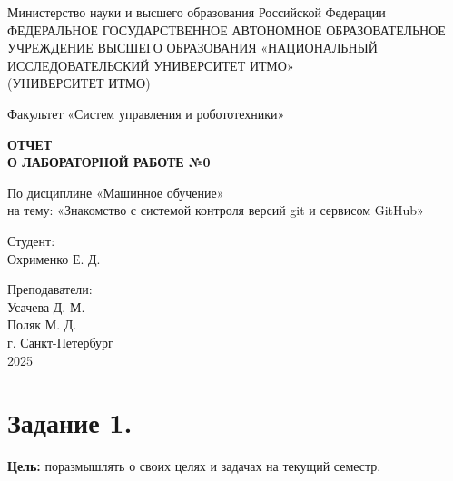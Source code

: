 \documentclass[a4paper,12pt]{article}
\begin{document}
	\begin{titlepage}
		\centering
		\vspace*{1cm}
		
		{\large Министерство науки и высшего образования Российской Федерации}\\
		{\large ФЕДЕРАЛЬНОЕ ГОСУДАРСТВЕННОЕ АВТОНОМНОЕ ОБРАЗОВАТЕЛЬНОЕ УЧРЕЖДЕНИЕ ВЫСШЕГО ОБРАЗОВАНИЯ «НАЦИОНАЛЬНЫЙ ИССЛЕДОВАТЕЛЬСКИЙ УНИВЕРСИТЕТ ИТМО»}\\
		{\large (УНИВЕРСИТЕТ ИТМО)}\\
		
		\vspace{2cm}
		
		{\large Факультет «Систем управления и робототехники»}\\
		
		\vspace{3cm}
		
		\textbf{{\Huge ОТЧЕТ}\\
			{\Huge О ЛАБОРАТОРНОЙ РАБОТЕ №0}}\\
		
		\vspace{1cm}
		
		{\LARGE По дисциплине «Машинное обучение»}\\
		{\LARGE на тему: «Знакомство с системой контроля версий git и сервисом GitHub»}\\
		
		\vspace{3cm}
		
		{\Large Студент:}\\
		Охрименко Е. Д. 
		
		\vspace{2cm}
		
		{\Large Преподаватели:}\\
		Усачева Д. М.\\
		Поляк М. Д.\\
		
		\vspace{3cm}
		{\large г. Санкт-Петербург}\\
		{\large 2025}
		
	\end{titlepage}
	\newpage
	
	
	\section{Задание 1.}
	\textbf{Цель: }  поразмышлять о своих целях и задачах на текущий семестр.
	
\end{document}
